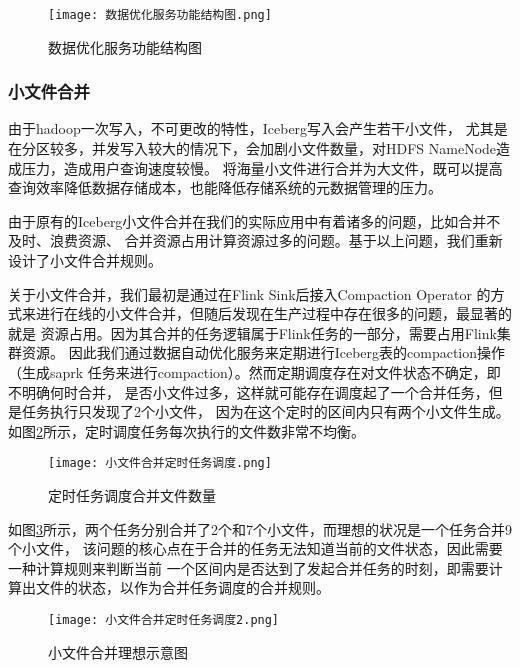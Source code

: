 \begin{figure}[H]
  \centering
  \texttt{[image: 数据优化服务功能结构图.png]}
  \caption{数据优化服务功能结构图}
  \label{fig:数据优化服务功能结构图}
\end{figure}

\subsubsection{小文件合并}

由于hadoop一次写入，不可更改的特性，Iceberg写入会产生若干小文件，
尤其是在分区较多，并发写入较大的情况下，会加剧小文件数量，对HDFS NameNode造成压力，造成用户查询速度较慢\cite{35}。
将海量⼩⽂件进⾏合并为⼤⽂件，既可以提高查询效率降低数据存储成本，也能降低存储系统的元数据管理的压力。

由于原有的Iceberg小文件合并在我们的实际应用中有着诸多的问题，比如合并不及时、浪费资源、
合并资源占用计算资源过多的问题。基于以上问题，我们重新设计了小文件合并规则。

关于小文件合并，我们最初是通过在Flink Sink后接入Compaction Operator
的方式来进行在线的小文件合并，但随后发现在生产过程中存在很多的问题，最显著的就是
资源占用。因为其合并的任务逻辑属于Flink任务的一部分，需要占用Flink集群资源。
因此我们通过数据自动优化服务来定期进行Iceberg表的compaction操作（生成saprk
任务来进行compaction）。然而定期调度存在对文件状态不确定，即不明确何时合并，
是否小文件过多，这样就可能存在调度起了一个合并任务，但是任务执行只发现了2个小文件，
因为在这个定时的区间内只有两个小文件生成。如图\ref{fig:小文件合并定时任务调度}所示，定时调度任务每次执行的文件数非常不均衡。

\begin{figure}[H]
  \centering
  \texttt{[image: 小文件合并定时任务调度.png]}
  \caption{定时任务调度合并文件数量}
  \label{fig:小文件合并定时任务调度}
\end{figure}

如图\ref{fig:小文件合并理想示意图}所示，两个任务分别合并了2个和7个小文件，而理想的状况是一个任务合并9个小文件，
该问题的核心点在于合并的任务无法知道当前的文件状态，因此需要一种计算规则来判断当前
一个区间内是否达到了发起合并任务的时刻，即需要计算出文件的状态，以作为合并任务调度的合并规则。

\begin{figure}[H]
  \centering
  \texttt{[image: 小文件合并定时任务调度2.png]}
  \caption{小文件合并理想示意图}
  \label{fig:小文件合并理想示意图}
\end{figure}

